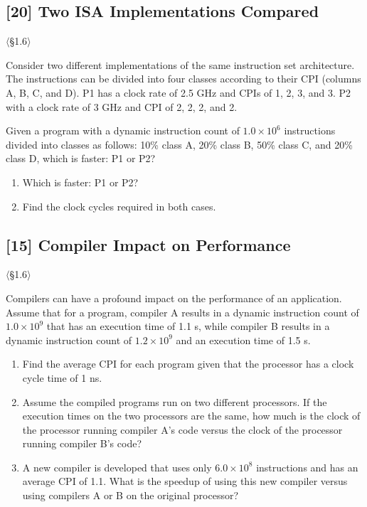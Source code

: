 \problembreak %

\subsection{[20] Two ISA Implementations Compared}
\hypertarget{prob-1.7}{}
\noindent$\langle$\S1.6$\rangle$\medskip

\noindent Consider two different implementations of the same instruction set
architecture. The instructions can be divided into four classes according to
their CPI (columns A, B, C, and D). P1 has a clock rate of 2.5 GHz and CPIs
of 1, 2, 3, and 3. P2 with a clock rate of 3 GHz and CPI of 2, 2, 2, and 2.

Given a program with a dynamic instruction count of $1.0 \times 10^6$
instructions divided into classes as follows: 10\% class A, 20\% class B,
50\% class C, and 20\% class D, which is faster: P1 or P2?

\begin{enumerate}
  \item[a.] Which is faster: P1 or P2?
  \item[b.] Find the clock cycles required in both cases.
\end{enumerate}

\problembreak %

\subsection{[15] Compiler Impact on Performance}
\hypertarget{prob-1.8}{}
\noindent$\langle$\S1.6$\rangle$\medskip

\noindent Compilers can have a profound impact on the performance of an application.
Assume that for a program, compiler A results in a dynamic instruction count
of $1.0 \times 10^9$ that has an execution time of 1.1 s, while compiler B
results in a dynamic instruction count of $1.2 \times 10^9$ and an execution
time of 1.5 s.

\begin{enumerate}
  \item[a.] Find the average CPI for each program given that the processor has
        a clock cycle time of 1 ns.
  \item[b.] Assume the compiled programs run on two different processors. If
        the execution times on the two processors are the same, how much is
        the clock of the processor running compiler A's code versus the clock
        of the processor running compiler B's code?
  \item[c.] A new compiler is developed that uses only $6.0 \times 10^8$
        instructions and has an average CPI of 1.1. What is the speedup of
        using this new compiler versus using compilers A or B on the original
        processor?
\end{enumerate}

